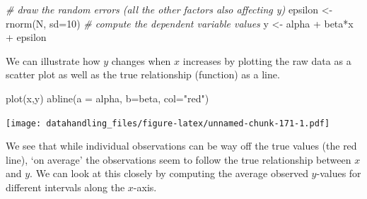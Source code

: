 \documentclass[
  12pt,
]{style/krantz}
\newenvironment{Shaded}{\begin{snugshade}}{\end{snugshade}}
\newcommand{\AttributeTok}[1]{\textcolor[rgb]{0.77,0.63,0.00}{#1}}
\newcommand{\CommentTok}[1]{\textcolor[rgb]{0.56,0.35,0.01}{\textit{#1}}}
\newcommand{\DecValTok}[1]{\textcolor[rgb]{0.00,0.00,0.81}{#1}}
\newcommand{\FunctionTok}[1]{\textcolor[rgb]{0.00,0.00,0.00}{#1}}
\newcommand{\NormalTok}[1]{#1}
\newcommand{\OtherTok}[1]{\textcolor[rgb]{0.56,0.35,0.01}{#1}}
\newcommand{\SpecialCharTok}[1]{\textcolor[rgb]{0.00,0.00,0.00}{#1}}
\newcommand{\StringTok}[1]{\textcolor[rgb]{0.31,0.60,0.02}{#1}}
\begin{document}
\begin{Shaded}
\begin{Highlighting}[]
\CommentTok{\# draw the random errors (all the other factors also affecting y)}
\NormalTok{epsilon }\OtherTok{\textless{}{-}} \FunctionTok{rnorm}\NormalTok{(N, }\AttributeTok{sd=}\DecValTok{10}\NormalTok{)}
\CommentTok{\# compute the dependent variable values}
\NormalTok{y }\OtherTok{\textless{}{-}}\NormalTok{ alpha }\SpecialCharTok{+}\NormalTok{ beta}\SpecialCharTok{*}\NormalTok{x }\SpecialCharTok{+}\NormalTok{ epsilon}
\end{Highlighting}
\end{Shaded}

We can illustrate how \(y\) changes when \(x\) increases by plotting the raw data as a scatter plot as well as the true relationship (function) as a line.

\begin{Shaded}
\begin{Highlighting}[]
\FunctionTok{plot}\NormalTok{(x,y)}
\FunctionTok{abline}\NormalTok{(}\AttributeTok{a =}\NormalTok{ alpha, }\AttributeTok{b=}\NormalTok{beta, }\AttributeTok{col=}\StringTok{"red"}\NormalTok{)}
\end{Highlighting}
\end{Shaded}

\texttt{[image: datahandling\_files/figure-latex/unnamed-chunk-171-1.pdf]}

We see that while individual observations can be way off the true values (the red line), `on average' the observations seem to follow the true relationship between \(x\) and \(y\). We can look at this closely by computing the average observed \(y\)-values for different intervals along the \(x\)-axis.
\end{document}
